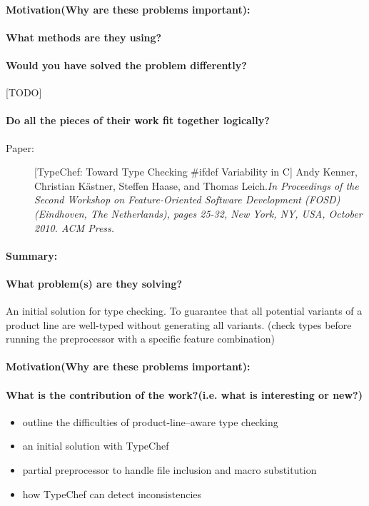 \documentclass[12pt]{article}
\begin{document}
\paragraph{Motivation(Why are these problems important):}


	
\paragraph{What methods are they using?}


\paragraph{Would you have solved the problem differently?}[TODO]
\paragraph{Do all the pieces of their work fit together logically?}


\clearpage
\begin{description}
\item[Paper:] [TypeChef: Toward Type Checking \#ifdef Variability in C] Andy Kenner, Christian Kästner, Steffen Haase, and Thomas Leich.\emph{In Proceedings of the Second Workshop on Feature-Oriented Software Development (FOSD) (Eindhoven, The Netherlands), pages 25-32, New York, NY, USA, October 2010. ACM Press.} 
\end{description}

\paragraph{Summary:}
\paragraph{What problem(s) are they solving?} An initial solution for type checking. To guarantee that all potential variants of a product line are well-typed without generating all variants. (check types before running the preprocessor with a specific feature combination)
\paragraph{Motivation(Why are these problems important):} 
\paragraph{What is the contribution of the work?(i.e. what is interesting or new?)} 
\begin{itemize}
	\item outline the difficulties of product-line–aware type checking
	\item an initial solution with TypeChef
	\item partial preprocessor to handle file inclusion and macro substitution
	\item how TypeChef can detect inconsistencies
\end{itemize}
\end{document}
